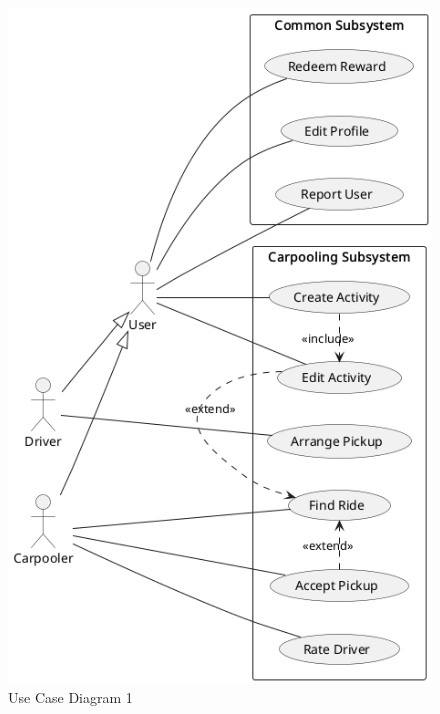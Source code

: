 \documentclass[11pt]{article}
\begin{document}
\begin{figure}
    \centering
    \includegraphics[width=\textwidth]{use-cases-carpooling}
    \caption{Use Case Diagram 1}
\end{figure}
\end{document}
